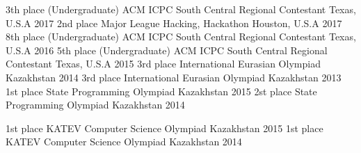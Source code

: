 \begin{cvhonors}
  \cvhonor
    {3th place (Undergraduate)}
    {ACM ICPC South Central Regional Contestant}
    {Texas, U.S.A}
    {2017}
  \cvhonor
    {2nd place}
    {Major League Hacking, Hackathon}
    {Houston, U.S.A}
    {2017}
  \cvhonor
    {8th place (Undergraduate)}
    {ACM ICPC South Central Regional Contestant}
    {Texas, U.S.A}
    {2016}
  \cvhonor
    {5th place (Undergraduate)}
    {ACM ICPC South Central Regional Contestant}
    {Texas, U.S.A}
    {2015}
  \cvhonor
    {3rd place}
    {International Eurasian Olympiad}
    {Kazakhstan}
    {2014}
  \cvhonor
    {3rd place}
    {International Eurasian Olympiad}
    {Kazakhstan}
    {2013}
  \cvhonor
    {1st place}
    {State Programming Olympiad}
    {Kazakhstan}
    {2015}
  \cvhonor
    {2st place}
    {State Programming Olympiad}
    {Kazakhstan}
    {2014}

  \cvhonor
    {1st place}
    {KATEV Computer Science Olympiad}
    {Kazakhstan}
    {2015}
  \cvhonor
    {1st place}
    {KATEV Computer Science Olympiad}
    {Kazakhstan}
    {2014}
  
\end{cvhonors}


